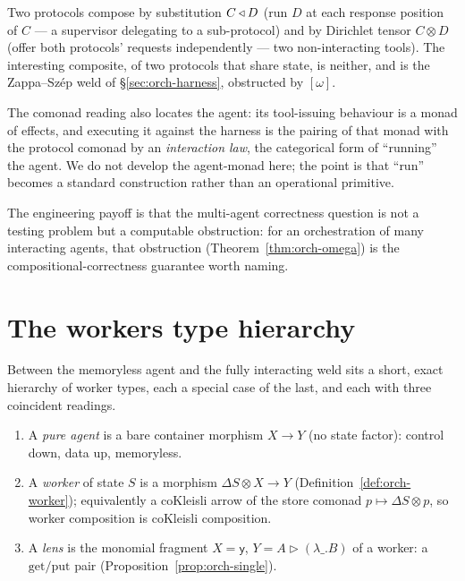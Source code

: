 \begin{corollary}\label{cor:orch-compose}
Two protocols compose by substitution $C\triangleleft D$ (run $D$ at each response position of $C$ ---
a supervisor delegating to a sub-protocol) and by Dirichlet tensor $C\otimes D$ (offer both protocols'
requests independently --- two non-interacting tools). The interesting composite, of two protocols
that share state, is neither, and is the Zappa--Sz\'ep weld of \S\ref{sec:orch-harness}, obstructed by
$[\omega]$.
\end{corollary}

\begin{remark}\label{rem:orch-run}
The comonad reading also locates the agent: its tool-issuing behaviour is a monad of effects, and
executing it against the harness is the pairing of that monad with the protocol comonad by an
\emph{interaction law}, the categorical form of ``running'' the agent.
We do not develop the agent-monad here; the point is that ``run'' becomes a standard construction
rather than an operational primitive.
\end{remark}

The engineering payoff is that the multi-agent correctness question is not a testing problem but a
computable obstruction: for an orchestration of many interacting agents, that obstruction
(Theorem~\ref{thm:orch-omega}) is the compositional-correctness guarantee worth naming.

\section{The workers type hierarchy}\label{sec:orch-hierarchy}

Between the memoryless agent and the fully interacting weld sits a short, exact hierarchy of worker
types, each a special case of the last, and each with three coincident readings.

\begin{definition}\label{def:orch-hierarchy}
\leavevmode
\begin{enumerate}
\item A \emph{pure agent} is a bare container morphism $X\to Y$ (no state factor): control down,
data up, memoryless.
\item A \emph{worker} of state $S$ is a morphism $\Delta S\otimes X\to Y$
(Definition~\ref{def:orch-worker}); equivalently a coKleisli arrow of the store comonad
$p\mapsto\Delta S\otimes p$, so worker composition is coKleisli composition.
\item A \emph{lens} is the monomial fragment $X=\mathsf{y}$, $Y=A\triangleright(\lambda\_.B)$ of a
worker: a $\mathrm{get}/\mathrm{put}$ pair (Proposition~\ref{prop:orch-single}).
\end{enumerate}
\end{definition}

